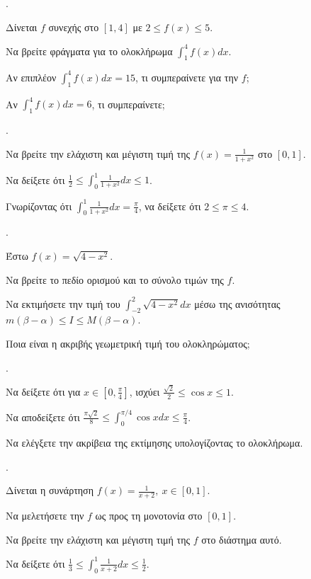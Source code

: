 \documentclass[11pt,a4paper,twocolumn]{article}
\newcounter{askhsh}
\newcommand{\askhsh}{\large\theaskhsh.\ \addtocounter{askhsh}{1}}
\begin{document}
\askhsh Δίνεται $f$ συνεχής στο $[1, 4]$ με $2 \le f(x) \le 5$.
\begin{alist}
\item Να βρείτε φράγματα για το ολοκλήρωμα $\int_1^4 f(x) dx$.
\item Αν επιπλέον $\int_1^4 f(x) dx = 15$, τι συμπεραίνετε για την $f$;
\item Αν $\int_1^4 f(x) dx = 6$, τι συμπεραίνετε;
\end{alist}

\askhsh 
\begin{alist}
\item Να βρείτε την ελάχιστη και μέγιστη τιμή της $f(x) = \frac{1}{1+x^2}$ στο $[0, 1]$.
\item Να δείξετε ότι $ \frac{1}{2} \le \int_0^1 \frac{1}{1+x^2} dx \le 1$.
\item Γνωρίζοντας ότι $\int_0^1 \frac{1}{1+x^2} dx = \frac{\pi}{4}$, να δείξετε ότι $2 \le \pi \le 4$.
\end{alist}

\askhsh Έστω $f(x) = \sqrt{4-x^2}$.
\begin{alist}
\item Να βρείτε το πεδίο ορισμού και το σύνολο τιμών της $f$.
\item Να εκτιμήσετε την τιμή του $\displaystyle \int_{-2}^2 \sqrt{4-x^2} dx$ μέσω της ανισότητας $m(\beta-\alpha) \le I \le M(\beta-\alpha)$.
\item Ποια είναι η ακριβής γεωμετρική τιμή του ολοκληρώματος;
\end{alist}

\askhsh
\begin{alist}
\item Να δείξετε ότι για $x \in [0, \frac{\pi}{4}]$, ισχύει $\frac{\sqrt{2}}{2} \le \cos x \le 1$.
\item Να αποδείξετε ότι $\frac{\pi\sqrt{2}}{8} \le \int_0^{\pi/4} \cos x dx \le \frac{\pi}{4}$.
\item Να ελέγξετε την ακρίβεια της εκτίμησης υπολογίζοντας το ολοκλήρωμα.
\end{alist}

\askhsh Δίνεται η συνάρτηση $f(x) = \frac{1}{x+2}, \ x \in [0, 1]$.
\begin{alist}
\item Να μελετήσετε την $f$ ως προς τη μονοτονία στο $[0, 1]$.
\item Να βρείτε την ελάχιστη και μέγιστη τιμή της $f$ στο διάστημα αυτό.
\item Να δείξετε ότι $\frac{1}{3} \le \displaystyle \int_0^1 \frac{1}{x+2} dx \le \frac{1}{2}$.
\end{alist}
\end{document}
